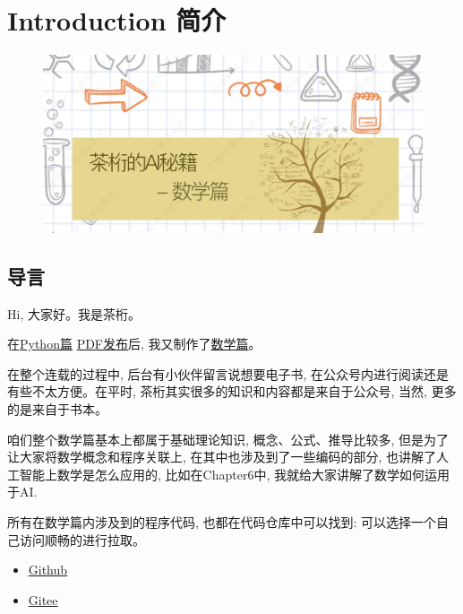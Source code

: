 \chapter{Introduction 简介}
\begin{figure}[ht]
  \centering\includegraphics[width=1\linewidth]{asset/茶桁的AI秘籍_数学篇.png}
\end{figure}

\newpage
\section{导言}

Hi, 大家好。我是茶桁。

在\href{https://mp.weixin.qq.com/mp/appmsgalbum?__biz=MzA4NzE4MDQzMg==&action=getalbum&album_id=3035995870421073928&scene=173&subscene=&sessionid=undefined&enterid=0&from_msgid=2648748542&from_itemidx=1&count=3&nolastread=1#wechat_redirect}{Python篇} \href{https://mp.weixin.qq.com/s/mbnag65xDP-1Ct_81Byn5g}{PDF发布}后, 我又制作了\href{https://mp.weixin.qq.com/mp/appmsgalbum?__biz=MzA4NzE4MDQzMg==&action=getalbum&album_id=3074770001140400130&from_itemidx=1&from_msgid=2648748768#wechat_redirect}{数学篇}。
  
在整个连载的过程中, 后台有小伙伴留言说想要电子书, 在公众号内进行阅读还是有些不太方便。在平时, 茶桁其实很多的知识和内容都是来自于公众号, 当然, 更多的是来自于书本。

咱们整个数学篇基本上都属于基础理论知识, 概念、公式、推导比较多, 但是为了让大家将数学概念和程序关联上, 在其中也涉及到了一些编码的部分, 也讲解了人工智能上数学是怎么应用的, 比如在Chapter6中, 我就给大家讲解了\hypertarget{数学如何运用于AI}{数学如何运用于AI}.

所有在数学篇内涉及到的程序代码, 也都在代码仓库中可以找到: 可以选择一个自己访问顺畅的进行拉取。

\begin{itemize}
  \item \href{https://github.com/hivandu/AI_Cheats}{Github}
  \item \href{https://gitee.com/hivandu/ai_cheats}{Gitee}
\end{itemize}

